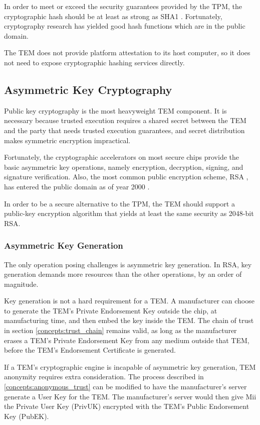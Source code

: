 In order to meet or exceed the security guarantees provided by the TPM, the
cryptographic hash should be at least as strong as SHA1 \cite{eastlake2001rus}.
Fortunately, cryptography research has yielded good hash functions which are
in the public domain.

The TEM does not provide platform attestation to its host computer, so it does
not need to expose cryptographic hashing services directly.

\subsection{Asymmetric Key Cryptography}\label{arch:crypto_asymmetric}
Public key cryptography is the most heavyweight TEM component. It is necessary
because trusted execution requires a shared secret between the TEM and the
party that needs trusted execution guarantees, and secret distribution makes
symmetric encryption impractical.

Fortunately, the cryptographic accelerators on most secure chips provide
the basic asymmetric key operations, namely encryption, decryption, signing,
and signature verification. Also, the most common public encryption scheme,
RSA \cite{rivest1978mod}, has entered the public domain as of year 2000
\cite{rsasec2000}.

In order to be a secure alternative to the TPM, the TEM should support a
public-key encryption algorithm that yields at least the same security as
2048-bit RSA.

\subsubsection{Asymmetric Key Generation}
The only operation posing challenges is asymmetric key generation. In RSA, key
generation demands more resources than the other operations, by an order of
magnitude.

Key generation is not a hard requirement for a TEM. A manufacturer can choose
to generate the TEM's Private Endorsement Key outside the chip, at manufacturing
time, and then embed the key inside the TEM. The chain of trust in section
\ref{concepts:trust_chain} remains valid, as long as the manufacturer erases a
TEM's Private Endorsement Key from any medium outside that TEM, before the
TEM's Endorsement Certificate is generated.

If a TEM's cryptographic engine is incapable of asymmetric key
generation, TEM anonymity requires extra consideration. The process described
in \ref{concepts:anonymous_trust} can be modified to have the manufacturer's
server generate a User Key for the TEM. The manufacturer's server would then
give Mii the Private User Key (PrivUK) encrypted with the TEM's Public
Endorsement Key (PubEK).

